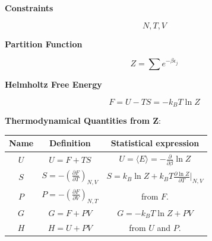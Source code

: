 \documentclass{article}
\begin{document}
\newpage

\begin{tcolorbox}[colframe=gray!90, colback=gray!5, coltitle=white, sharp corners, title=\textbf{Canonical Ensamble, Summary}, fonttitle=\large\bfseries]

    \textbf{Constraints}

    \begin{equation}
        N, T, V
    \end{equation}

    \textbf{Partition Function}

    \begin{equation}
        Z = \sum e^{-\beta \epsilon_j}
    \end{equation}

    \textbf{Helmholtz Free Energy}

    \begin{equation}
        F = U - TS= -k_BT \ln{Z}
    \end{equation}

    \vspace{0.3cm} %
    \textbf{Thermodynamical Quantities from Z}:

    \begin{center}
        \begin{tabular}{|c|c|c|}
            \hline
            \textbf{Name} & \textbf{Definition}                                           & \textbf{Statistical expression}                                           \\ \hline
            \( U \)       & \( U = F + TS \)                                              & \( U = \langle E \rangle = -\frac{\partial}{\partial \beta} \ln Z \)      \\ \hline
            \( S \)       & \( S = -\left( \frac{\partial F}{\partial T} \right)_{N,V} \) & \( S = k_B \ln Z + k_B T \frac{\partial \ln Z}{\partial T} \Big|_{N,V} \) \\ \hline
            \( P \)       & \( P = -\left( \frac{\partial F}{\partial V} \right)_{N,T} \) & from \( F \).                                                             \\ \hline
            \( G \)       & \( G = F + PV \)                                              & \( G = -k_B T \ln Z + PV \)                                               \\ \hline
            \( H \)       & \( H = U + PV \)                                              & from \( U \) and \( P \).                                                 \\ \hline
        \end{tabular}
    \end{center}

\end{tcolorbox}
\end{document}
